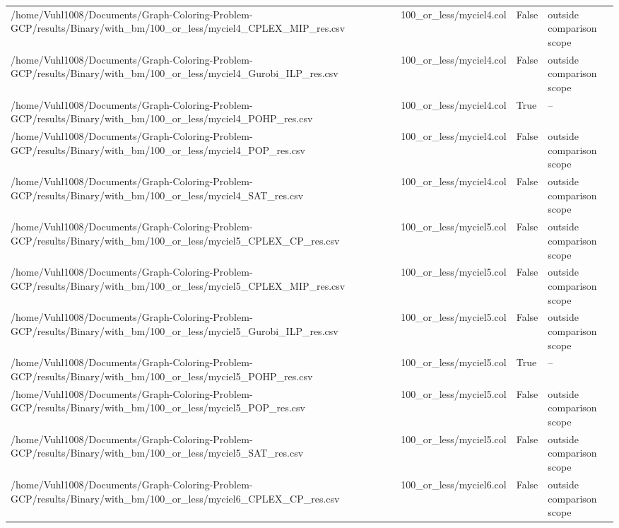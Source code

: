 \begin{table}[htbp]
\begin{tabular}{llll}
/home/Vuhl1008/Documents/Graph-Coloring-Problem-GCP/results/Binary/with\_bm/100\_or\_less/myciel4\_CPLEX\_MIP\_res.csv & 100\_or\_less/myciel4.col & False & outside comparison scope \\
/home/Vuhl1008/Documents/Graph-Coloring-Problem-GCP/results/Binary/with\_bm/100\_or\_less/myciel4\_Gurobi\_ILP\_res.csv & 100\_or\_less/myciel4.col & False & outside comparison scope \\
/home/Vuhl1008/Documents/Graph-Coloring-Problem-GCP/results/Binary/with\_bm/100\_or\_less/myciel4\_POHP\_res.csv & 100\_or\_less/myciel4.col & True & -- \\
/home/Vuhl1008/Documents/Graph-Coloring-Problem-GCP/results/Binary/with\_bm/100\_or\_less/myciel4\_POP\_res.csv & 100\_or\_less/myciel4.col & False & outside comparison scope \\
/home/Vuhl1008/Documents/Graph-Coloring-Problem-GCP/results/Binary/with\_bm/100\_or\_less/myciel4\_SAT\_res.csv & 100\_or\_less/myciel4.col & False & outside comparison scope \\
/home/Vuhl1008/Documents/Graph-Coloring-Problem-GCP/results/Binary/with\_bm/100\_or\_less/myciel5\_CPLEX\_CP\_res.csv & 100\_or\_less/myciel5.col & False & outside comparison scope \\
/home/Vuhl1008/Documents/Graph-Coloring-Problem-GCP/results/Binary/with\_bm/100\_or\_less/myciel5\_CPLEX\_MIP\_res.csv & 100\_or\_less/myciel5.col & False & outside comparison scope \\
/home/Vuhl1008/Documents/Graph-Coloring-Problem-GCP/results/Binary/with\_bm/100\_or\_less/myciel5\_Gurobi\_ILP\_res.csv & 100\_or\_less/myciel5.col & False & outside comparison scope \\
/home/Vuhl1008/Documents/Graph-Coloring-Problem-GCP/results/Binary/with\_bm/100\_or\_less/myciel5\_POHP\_res.csv & 100\_or\_less/myciel5.col & True & -- \\
/home/Vuhl1008/Documents/Graph-Coloring-Problem-GCP/results/Binary/with\_bm/100\_or\_less/myciel5\_POP\_res.csv & 100\_or\_less/myciel5.col & False & outside comparison scope \\
/home/Vuhl1008/Documents/Graph-Coloring-Problem-GCP/results/Binary/with\_bm/100\_or\_less/myciel5\_SAT\_res.csv & 100\_or\_less/myciel5.col & False & outside comparison scope \\
/home/Vuhl1008/Documents/Graph-Coloring-Problem-GCP/results/Binary/with\_bm/100\_or\_less/myciel6\_CPLEX\_CP\_res.csv & 100\_or\_less/myciel6.col & False & outside comparison scope \\

\end{tabular}
\end{table}
